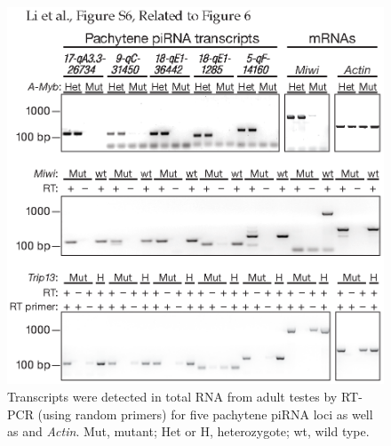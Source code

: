     \begin{figure}[htbp] %
      \centering 
      \includegraphics{Figures/MolCel/MolCel2013_FigS6.eps}
      \caption[Pachytene piRNA Precursor Abundance in \amyb{}, \miwi{}, and \textit{Trip13} Mutants]
      {
      Transcripts were detected in total RNA from adult testes by RT-PCR (using random primers) for five pachytene piRNA loci as well as \miwi{} and \textit{Actin}. Mut, mutant; Het or H, heterozygote; wt, wild type.
      }
      \label{fig:MolCelS6}
   	  \end{figure}

